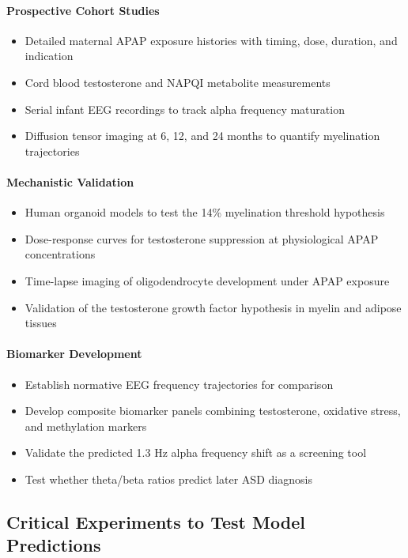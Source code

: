 \documentclass[11pt]{article}
\let\oldsubsection\subsection
\renewcommand{\subsection}[1]{\oldsubsection{#1}\setlength{\leftskip}{0.75em}}
\begin{document}
\paragraph{Prospective Cohort Studies}
\begin{itemize}
\item Detailed maternal APAP exposure histories with timing, dose, duration, and indication
\item Cord blood testosterone and NAPQI metabolite measurements
\item Serial infant EEG recordings to track alpha frequency maturation
\item Diffusion tensor imaging at 6, 12, and 24 months to quantify myelination trajectories
\end{itemize}

\paragraph{Mechanistic Validation}
\begin{itemize}
\item Human organoid models to test the 14\% myelination threshold hypothesis
\item Dose-response curves for testosterone suppression at physiological APAP concentrations
\item Time-lapse imaging of oligodendrocyte development under APAP exposure
\item Validation of the testosterone growth factor hypothesis in myelin and adipose tissues
\end{itemize}

\paragraph{Biomarker Development}
\begin{itemize}
\item Establish normative EEG frequency trajectories for comparison
\item Develop composite biomarker panels combining testosterone, oxidative stress, and methylation markers
\item Validate the predicted 1.3 Hz alpha frequency shift as a screening tool
\item Test whether theta/beta ratios predict later ASD diagnosis
\end{itemize}

\subsection{Critical Experiments to Test Model Predictions}
\end{document}

